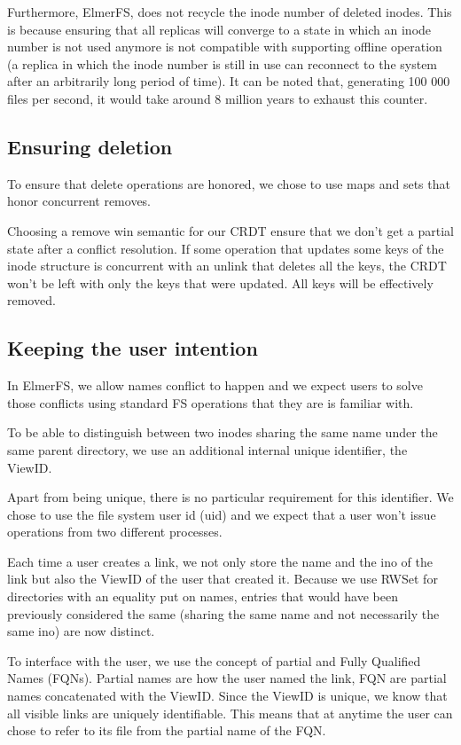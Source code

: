 \documentclass[sigconf,anonymous,10pt]{acmart}
\begin{document}
Furthermore, ElmerFS, does not recycle the inode number of deleted inodes.
This is because ensuring that all replicas will converge to a state in which
an inode number is not used anymore is not compatible with supporting offline
operation (a replica in which the inode number is still in use can reconnect
to the system after an arbitrarily long period of time).
It can be noted that, generating 100 000 files per second, it would take around
8 million years to exhaust this counter.

\subsection{Ensuring deletion}

\label{sec:deletion}
To ensure that delete operations are honored, we chose to use maps and sets that
honor concurrent removes.

Choosing a remove win semantic for our CRDT ensure that we don't get a partial
state after a conflict resolution. If some operation that updates some keys of the
inode structure is concurrent with an unlink that deletes all the keys, the
CRDT won't be left with only the keys that were updated.
All keys will be effectively removed.

\subsection{Keeping the user intention}

In ElmerFS, we allow names conflict to happen and we expect users to solve
those conflicts using standard FS operations that they are is familiar with.

To be able to distinguish between two inodes sharing the same name under
the same parent directory, we use an additional internal unique identifier,
the ViewID.

Apart from being unique, there is no particular requirement for this identifier.
We chose to use the file system user id (uid) and we expect that a
user won’t issue operations from two different processes.

Each time a user creates a link, we not only store the name and the ino
of the link but also the ViewID of the user that created it.
Because we use RWSet for directories with an equality put on names,
entries that would have been previously considered the same
(sharing the same name and not necessarily the same ino) are now distinct.

To interface with the user, we use the concept of partial and
Fully Qualified Names (FQNs).
Partial names are how the user named the link,
FQN are partial names concatenated with the ViewID.
Since the ViewID is unique, we know that all visible links are uniquely
identifiable. This means that at anytime the user can chose to refer to its file
from the partial name of the FQN.
\end{document}
